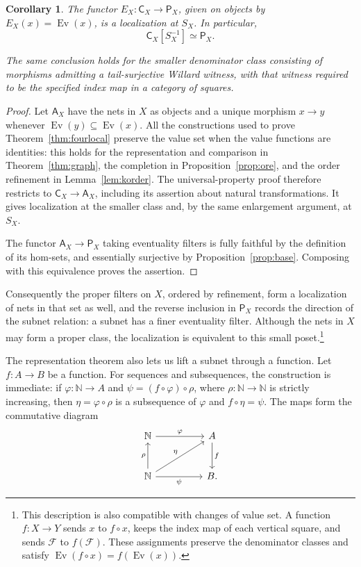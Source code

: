\documentclass[11pt,a4paper]{article}
\newtheorem{corollary}[theorem]{Corollary}
\theoremstyle{definition}
\theoremstyle{remark}
\newcommand{\FF}{\mathcal F}
\newcommand{\CC}{\mathsf C}
\newcommand{\Ev}{\operatorname{Ev}}
\begin{document}
\begin{samepage}
\begin{corollary}\label{cor:fixedset}
The functor \(E_X:\CC_X\to\mathsf P_X\), given on objects by
\(E_X(x)=\Ev(x)\), is a localization at \(S_X\). In particular,
\[
 \CC_X[S_X^{-1}]\simeq\mathsf P_X.
\]

The same conclusion holds for the smaller denominator class consisting
of morphisms admitting a tail-surjective Willard witness, with that
witness required to be the specified index map in a category of squares.
\end{corollary}
\end{samepage}
\begin{proof}
Let \(\mathsf A_X\) have the nets in \(X\) as objects and a unique
morphism \(x\to y\) whenever \(\Ev(y)\subseteq\Ev(x)\). All the
constructions used to prove Theorem~\ref{thm:fourlocal} preserve the
value set when the value functions are identities: this holds for
the representation and comparison in Theorem~\ref{thm:graph}, the
completion in Proposition~\ref{prop:ore}, and the order refinement
in Lemma~\ref{lem:korder}. The universal-property proof therefore
restricts to \(\CC_X\to\mathsf A_X\), including its assertion about
natural transformations. It gives localization at the smaller class
and, by the same enlargement argument, at \(S_X\).

The functor \(\mathsf A_X\to\mathsf P_X\) taking eventuality filters
is fully faithful by the definition of its hom-sets, and essentially
surjective by Proposition~\ref{prop:base}. Composing with this
equivalence proves the assertion.
\end{proof}

Consequently the proper filters on \(X\), ordered by refinement,
form a localization of nets in that set as well, and the reverse
inclusion in \(\mathsf P_X\) records the direction of the subnet
relation: a subnet has a finer eventuality filter. Although the nets
in \(X\) may form a proper class, the localization is equivalent to
this small poset.\footnote{This description is also compatible with
changes of value set. A function \(f:X\to Y\) sends \(x\) to
\(f\circ x\), keeps the index map of each vertical square, and sends
\(\FF\) to \(f(\FF)\). These assignments preserve the denominator
classes and satisfy \(\Ev(f\circ x)=f(\Ev(x))\).}

The representation theorem also lets us lift a subnet through a
function. Let \(f:A\to B\) be a function. For sequences
and subsequences, the construction is immediate: if
\(\varphi:\mathbb N\to A\) and
\(\psi=(f\circ\varphi)\circ\rho\), where
\(\rho:\mathbb N\to\mathbb N\) is strictly increasing, then
\(\eta=\varphi\circ\rho\) is a subsequence of \(\varphi\)
and \(f\circ\eta=\psi\). The maps form the commutative diagram
\[
\begin{tikzcd}[row sep=large,column sep=huge]
\mathbb N\arrow[r,"\varphi"]&A\arrow[d,"f"]\\
\mathbb N\arrow[u,"\rho"]\arrow[ur,"\eta",description]
  \arrow[r,"\psi"']&B.
\end{tikzcd}
\]
\end{document}
